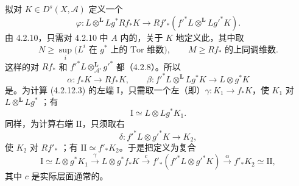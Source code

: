 拟对 $K\in D^s(X,\mathscr A)$ 定义一个
\[\varphi:L\otimes^{\mathbf L}Lg^*Rf_*K\longrightarrow Rf'_*(f'^*L\otimes^{\mathbf L}Lg'^*K).\tag{4.2.12.3}\]
由 4.2.10，只需对 4.2.10 中 $A$ 内的，关于 $K$ 地定义此，其中取
\[N\ge\sup_i\bigl(L^i\text{ 在 }g^*\text{ 上的 Tor 维数}\bigr),\qquad M\ge Rf_*\text{ 的上同调维数}.\]
这样的对 $Rf_*$ 和 $f'^*L\otimes^{\mathbf L}_{\mathscr A'}g'^*$ 都（4.2.8）。所以
\[\alpha:f_*K\longrightarrow Rf_*K,\qquad\beta:f'^*L\otimes^{\mathbf L}Lg^*K\longrightarrow L\otimes g^*K\]
是。为计算 (4.2.12.3) 的左端 $\mathrm I$，只需取一个左（即）$\gamma:K_1\to f_*K$，使 $K_1$ 对 $L\otimes^{\mathbf L}Lg^*$ ；有
\[\mathrm I\simeq L\otimes Lg^*K_1.\]
同样，为计算右端 $\mathrm{II}$，只须取右
\[\delta:f'^*L\otimes g'^*K\longrightarrow K_2,\]
使 $K_2$ 对 $Rf'_*$ ；有 $\mathrm{II}\simeq f'_*K_2$。于是把定义为复合
\[\mathrm I\simeq L\otimes g^*K_1\xrightarrow{\gamma}L\otimes g^*f_*K\xrightarrow{c}f'_*(f'^*L\otimes g'^*K)\xrightarrow{\alpha}f'_*K_2\simeq\mathrm{II},\]
其中 $c$ 是实际层面通常的。

